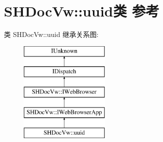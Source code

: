 \hypertarget{interface_s_h_doc_vw_1_1uuid}{}\section{S\+H\+Doc\+Vw\+:\+:uuid类 参考}
\label{interface_s_h_doc_vw_1_1uuid}
类 S\+H\+Doc\+Vw\+:\+:uuid 继承关系图\+:\begin{figure}[H]
\begin{center}
\leavevmode
\includegraphics[height=5.000000cm]{interface_s_h_doc_vw_1_1uuid}
\end{center}
\end{figure}
